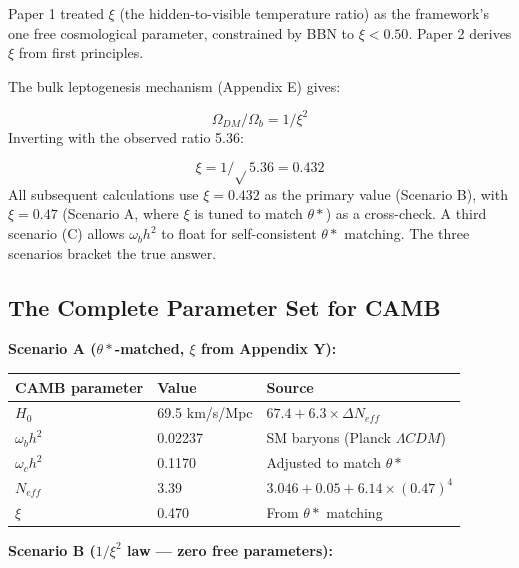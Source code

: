 \documentclass[aps,prd,preprint,superscriptaddress,longbibliography]{revtex4-2}
\begin{document}
Paper 1 treated $\xi$ (the hidden-to-visible temperature ratio) as the framework's one free cosmological parameter, constrained by BBN to $\xi < 0.50$. Paper 2 derives $\xi$ from first principles.

The bulk leptogenesis mechanism (Appendix E) gives:


\begin{equation}
    \Omega_{DM} / \Omega_b = 1/\xi^{2}
\end{equation}
Inverting with the observed ratio 5.36:


\begin{equation}
    \xi = 1/\sqrt{}5.36 = 0.432
\end{equation}
All subsequent calculations use $\xi = 0.432$ as the primary value (Scenario B), with $\xi = 0.47$ (Scenario A, where $\xi$ is tuned to match $\theta*$) as a cross-check. A third scenario (C) allows $\omega_b h^{2}$ to float for self-consistent $\theta*$ matching. The three scenarios bracket the true answer.


\subsection{The Complete Parameter Set for CAMB}

\textbf{Scenario A ($\theta*$-matched, $\xi$ from Appendix Y):}


\begin{table}[H]
\begin{ruledtabular}
\begin{tabular}{p{5.0cm}p{5.0cm}p{5.0cm}}
CAMB parameter & Value & Source \\
\hline
$H_{0}$ & 69.5 km/s/Mpc & $67.4 + 6.3 \times \Delta N_{eff}$ \\
$\omega_b h^{2}$ & 0.02237 & SM baryons (Planck $\Lambda CDM$) \\
$\omega_c h^{2}$ & 0.1170 & Adjusted to match $\theta*$ \\
$N_{eff}$ & 3.39 & $3.046 + 0.05 + 6.14\times(0.47)^{4}$ \\
$\xi$ & 0.470 & From $\theta*$ matching \\
\end{tabular}
\end{ruledtabular}
\end{table}

\textbf{Scenario B ($1/\xi^{2}$ law --- zero free parameters):}
\end{document}
